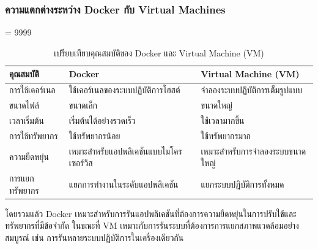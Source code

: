 \subsubsection{ความแตกต่างระหว่าง Docker กับ Virtual Machines}
\tolerance= 9999
\begin{table}[H]
  \centering
  \caption{เปรียบเทียบคุณสมบัติของ Docker และ Virtual Machine (VM)}
  \label{tab:docker-vm}

  \renewcommand{\arraystretch}{1.3} %
  \setlength{\extrarowheight}{3pt}  %
  \setlength{\tabcolsep}{8pt}       %

  
  \begin{tabular}{|>{\raggedright\arraybackslash}p{3cm}|>{\raggedright\arraybackslash}p{5cm}|>{\raggedright\arraybackslash}p{5cm}|}
      \hline
      \rowcolor{gray!20} 
      \textbf{คุณสมบัติ} & \textbf{Docker} & \textbf{Virtual Machine (VM)} \\
      \hline
      การใช้เคอร์เนล & ใช้เคอร์เนลของระบบปฏิบัติการโฮสต์ & จำลองระบบปฏิบัติการเต็มรูปแบบ \\
      \hline
      ขนาดไฟล์ & ขนาดเล็ก & ขนาดใหญ่ \\
      \hline
      เวลาเริ่มต้น & เริ่มต้นได้อย่างรวดเร็ว & ใช้เวลามากขึ้น \\
      \hline
      การใช้ทรัพยากร & ใช้ทรัพยากรน้อย & ใช้ทรัพยากรมาก \\
      \hline
      ความยืดหยุ่น & เหมาะสำหรับแอปพลิเคชันแบบไมโครเซอร์วิส & เหมาะสำหรับการจำลองระบบขนาดใหญ่ \\
      \hline
      การแยกทรัพยากร & แยกการทำงานในระดับแอปพลิเคชัน & แยกระบบปฏิบัติการทั้งหมด \\
      \hline
  \end{tabular}
\end{table}

\hspace{1.27cm}โดยรวมแล้ว Docker เหมาะสำหรับการรันแอปพลิเคชันที่ต้องการความยืดหยุ่นในการปรับใช้และทรัพยากรที่มีข้อจำกัด ในขณะที่ VM เหมาะกับการรันระบบที่ต้องการการแยกสภาพแวดล้อมอย่างสมบูรณ์ เช่น การรันหลายระบบปฏิบัติการในเครื่องเดียวกัน




